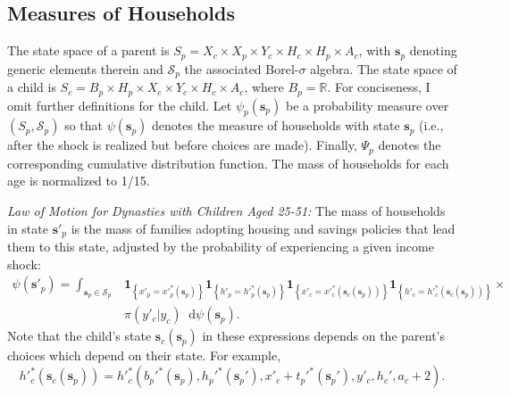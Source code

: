 \documentclass[12pt]{article}
\newcommand*\diff{\mathop{}\!\mathrm{d}}
\newcommand{\mc}{\mathcal}
\begin{document}
\subsection{Measures of Households}\label{sec:hhmeasures}
The state space of a parent is $S_p = X_c \times X_p \times Y_c \times H_c \times H_p \times A_c$, with $\mathbf{s}_p$ denoting generic elements therein and $\mc{S}_p$ the associated Borel-$\sigma$ algebra. The state space of a child is $S_c= B_p \times H_p \times X_c \times Y_c \times H_c \times A_c$, where $B_p=\mathbb{R}$. For conciseness, I omit further definitions for the child. Let $\psi_p(\mathbf s_p)$ be a probability measure over $(S_p,\mc{S}_p)$ so that $\psi(\mathbf s_p)$ denotes the measure of households with state $\mathbf s_p$ (i.e., after the shock is realized but before choices are made). Finally, $\Psi_p$ denotes the corresponding cumulative distribution function. The mass of households for each age is normalized to 1/15.

\textit{Law of Motion for Dynasties with Children Aged 25-51:} The mass of households in state $\mathbf{s}'_p$ is the mass of families adopting housing and savings policies that lead them to this state, adjusted by the probability of experiencing a given income shock:
\begin{equation}\label{eq:LoM}
\begin{split}
\psi(\mathbf{s}'_p) = \int_{\mathbf{s}_p\in \mathcal{S}_p} & 
\mathbf{1}_{\left\{ x'_p = x'^*_p(\mathbf s_p) \right\} }
\mathbf{1}_{\left\{ h'_p = h'^*_p(\mathbf s_p) \right\} } 
\mathbf{1}_{\left\{ x'_c = x'^*_c(\mathbf s_c(\mathbf s_p))\right\}} 
\mathbf{1}_{\left\{ h'_c = h'^*_c(\mathbf s_c(\mathbf s_p))\right\}} \times \\
&\pi(y'_c|y_c)\diff \psi(\mathbf s_p).
\end{split}
\end{equation}
Note that the child's state $\mathbf{s}_c(\mathbf{s}_p)$ in these expressions depends on the parent's choices which depend on their state. For example, 
\begin{equation}
h'^*_c\left(\mathbf s_c(\mathbf s_p)\right) =h'^*_c\left(b_p'^*(\mathbf{s}_p),h_p'^*(\mathbf{s}_p'),x'_c + t_p'^*(\mathbf{s}_p'),y'_c,h_c',a_c+2 \right).
\end{equation}
\end{document}
